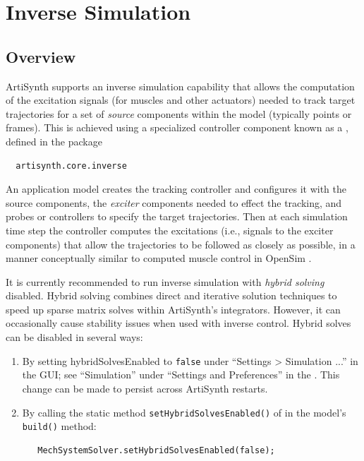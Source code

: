 \ifdefined\maindoc\else
\def\doctitle{Inverse Simulation}

\mainmatter
\fi

\chapter{Inverse Simulation}
\label{InverseSimulation:sec}

\section{Overview}

ArtiSynth supports an inverse simulation capability that allows the computation
of the excitation signals (for muscles and other actuators) needed to track
target trajectories for a set of {\it source} components within the model
(typically points or frames). This is achieved using a specialized controller
component known as a
, defined in the package
%
\begin{verbatim}
  artisynth.core.inverse
\end{verbatim}
%
An application model creates the tracking controller and configures it with the
source components, the {\it exciter} components needed to effect the tracking,
and probes or controllers to specify the target trajectories. Then at each
simulation time step the controller computes the excitations (i.e., signals to
the exciter components) that allow the trajectories to be followed as closely
as possible, in a manner conceptually similar to computed muscle control in
OpenSim \cite{delp2007opensim}.

\begin{sideblock}
It is currently recommended to run inverse simulation with {\it hybrid solving}
disabled. Hybrid solving combines direct and iterative solution techniques to
speed up sparse matrix solves within ArtiSynth's integrators. However, it can
occasionally cause stability issues when used with inverse control.  Hybrid
solves can be disabled in several ways:

\begin{enumerate}

\item By setting {\sf hybridSolvesEnabled} to {\tt false} 
under ``{\sf Settings > Simulation ...}'' in the GUI;
see ``Simulation'' under ``Settings and Preferences'' in the
. This change
can be made to persist across ArtiSynth restarts.

\item By calling the static method 
{\tt setHybridSolvesEnabled()} of 
 in the model's {\tt build()}
method:
%
\begin{verbatim}
   MechSystemSolver.setHybridSolvesEnabled(false);
\end{verbatim}
%
\end{enumerate}

\end{sideblock}

